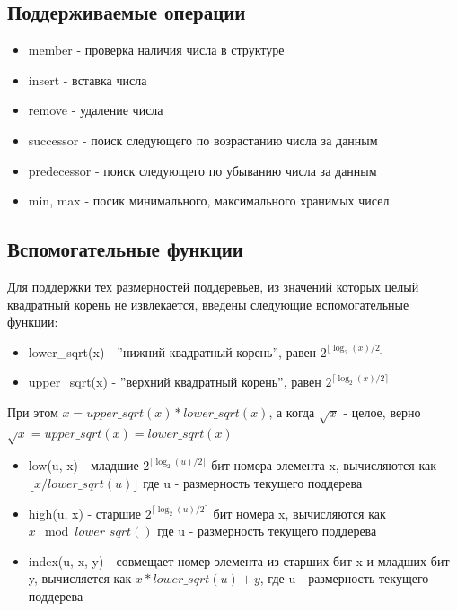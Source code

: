 \documentclass{article}
\begin{document}
\subsection{Поддерживаемые операции}
\begin{itemize}
    \item member - проверка наличия числа в структуре
    \item insert - вставка числа
    \item remove - удаление числа
    \item successor - поиск следующего по возрастанию числа за данным
    \item predecessor - поиск следующего по убыванию числа за данным
    \item min, max - посик минимального, максимального хранимых чисел 
\end{itemize}
\subsection{Вспомогательные функции}
Для поддержки тех размерностей поддеревьев, из значений которых целый квадратный корень не извлекается, введены следующие вспомогательные функции:
\begin{itemize}
    \item lower\_sqrt(x) - ''нижний квадратный корень'', равен $2^{\lfloor\log_{2}(x)/2\rfloor}$
    \item upper\_sqrt(x) - ''верхний квадратный корень'', равен $2^{\lceil\log_{2}(x)/2\rceil}$
\end{itemize}
При этом $x = upper\_sqrt(x) * lower\_sqrt(x)$, а когда $\sqrt{x}$ - целое, верно $\sqrt{x} = upper\_sqrt(x) = lower\_sqrt(x)$
\begin{itemize}
    \item low(u, x) - младшие $2^{\lfloor\log_{2}(u)/2\rfloor}$ бит номера элемента x, вычисляются как $\lfloor{x/lower\_sqrt(u)}\rfloor$ где u - размерность текущего поддерева
    \item high(u, x) - старшие $2^{\lceil\log_{2}(u)/2\rceil}$ бит номера x, вычисляются как $x\mod{lower\_sqrt()}$  где u - размерность текущего поддерева
    \item index(u, x, y) - совмещает номер элемента из старших бит x и младших бит y, вычисляется как $x*lower\_sqrt(u) + y$, где u - размерность текущего поддерева
    
\end{itemize}
\end{document}
